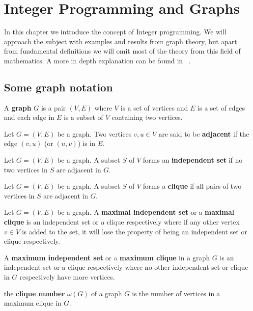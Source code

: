\chapter{Integer Programming and Graphs}
In this chapter we introduce the concept of Integer programming. We will approach the subject with examples and results from graph theory, but apart from fundamental definitions we will omit most of the theory from this field of mathematics. A more in depth explanation can be found in ~\cite{wolsey1998integer}. 
\section{Some graph notation}
\begin{definition}\label{graph}
A \textbf{graph} $G$ is a pair $(V,E)$ where $V$ is a set of vertices and $E$ is a set of edges and each edge in $E$ is a subset of $V$ containing two vertices.
\end{definition}
\begin{definition}
Let $G=(V,E)$ be a graph. Two vertices $v,u\in V$ are said to be \textbf{adjacent} if the edge $(v,u)$ (or $(u,v)$) is in $E$.
\end{definition}
\begin{definition}
Let $G=(V,E)$ be a graph. A subset $S$ of $V$ forms an \textbf{independent set} if no two vertices in $S$ are adjacent in $G$.
\end{definition}
\begin{definition}
Let $G=(V,E)$ be a graph. A subset $S$ of $V$ forms a \textbf{clique} if all pairs of two vertices in $S$ are adjacent in $G$.
\end{definition}
\begin{definition}
Let $G=(V,E)$ be a graph. A \textbf{maximal independent set} or a \textbf{maximal clique} is an independent set or a clique respectively where if any other vertex $v \in V$ is added to the set, it will lose the property of being an independent set or clique respectively.
\end{definition}
\begin{definition}
A \textbf{maximum independent set} or a \textbf{maximum clique} in a graph $G$ is an independent set or a clique respectively where no other independent set or clique in $G$ respectively have more vertices.
\end{definition}
\begin{definition}
the \textbf{clique number} $\omega(G)$ of a graph $G$ is the number of vertices in a maximum clique in $G$.
\end{definition}

